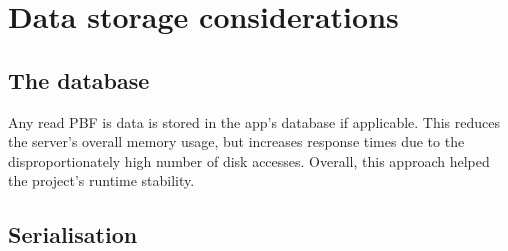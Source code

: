 \chapter{Data storage considerations}
\section{The database}

Any read PBF is data is stored in the app's database if applicable. This reduces the server's overall memory usage, but increases response times due to the disproportionately high number of disk accesses. Overall, this approach helped the project's runtime stability.

\label{serialise}
\section{Serialisation}